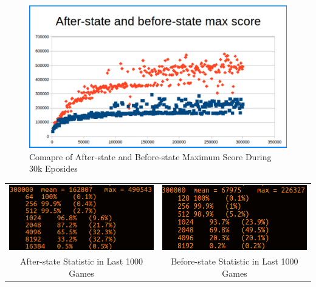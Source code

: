 \documentclass[12pt,a4paper]{article}
\begin{document}
\begin{figure}[hbt]
\centering
\includegraphics[scale=0.3]{max_compare.png}
\caption{Comapre of After-state and Before-state Maximum Score During 30k Eposides}
\label{fig:compare_max}
\end{figure}

\begin{tabular}{|c|c|}
      \hline
      \includegraphics[scale=0.5]{after_state.png} &
      \includegraphics[scale=0.5]{before_state.png} \\
      \small After-state Statistic in Last 1000 Games &  Before-state Statistic in Last 1000 Games \\
      \hline
      
\end{tabular}
\end{document}
